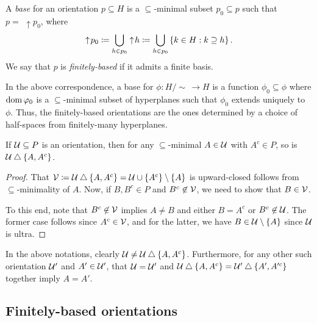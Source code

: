 \documentclass{amsart}
\begin{document}
    \begin{definition}
        A \textit{base} for an orientation $p\subseteq H$ is a $\subseteq$-minimal subset $p_0\subseteq p$ such that $p=\,\,\uparrow\! p_0$, where
        \begin{equation*}
            \uparrow\! p_0\coloneqq\bigcup_{h\in p_0}\uparrow\! h\coloneqq\bigcup_{h\in p_0}\left\{k\in H: k\supseteq h\right\}.
        \end{equation*}
        We say that $p$ is \textit{finitely-based} if it admits a finite basis.
    \end{definition}

    In the above correspondence, a base for $\phi:H/\!\sim\,\to H$ is a function $\phi_0\subseteq\phi$ where $\operatorname{dom}\varphi_0$ is a $\subseteq$-minimal subset of hyperplanes such that $\phi_0$ extends uniquely to $\phi$. Thus, the finitely-based orientations are the ones determined by a choice of half-spaces from finitely-many hyperplanes.

    \begin{lemma}\label{tree-well-defined}
        If $\mathcal{U}\subseteq P$ is an orientation, then for any $\subseteq$-minimal $A\in\mathcal{U}$ with $A^c\in P$, so is $\mathcal{U}\bigtriangleup\left\{A,A^c\right\}$.
    \end{lemma}
    \begin{proof}
        That $\mathcal{V}\coloneqq\mathcal{U}\bigtriangleup\left\{A,A^c\right\}=\mathcal{U}\cup\left\{A^c\right\}\setminus\left\{A\right\}$ is upward-closed follows from $\subseteq$-minimality of $A$. Now, if $B,B^c\in P$ and $B^c\not\in\mathcal{V}$, we need to show that $B\in\mathcal{V}$.

        To this end, note that $B^c\not\in\mathcal{V}$ implies $A\neq B$ and either $B=A^c$ or $B^c\not\in\mathcal{U}$. The former case follows since $A^c\in\mathcal{V}$, and for the latter, we have $B\in\mathcal{U}\setminus\left\{A\right\}$ since $\mathcal{U}$ is ultra.
    \end{proof}

    \begin{remark}\label{tree-no-loops}
        In the above notations, clearly $\mathcal{U}\neq\mathcal{U}\bigtriangleup\left\{A,A^c\right\}$. Furthermore, for any other such orientation $\mathcal{U}'$ and $A'\in\mathcal{U}'$, that $\mathcal{U}=\mathcal{U}'$ and $\mathcal{U}\bigtriangleup\left\{A,A^c\right\}=\mathcal{U}'\bigtriangleup\left\{A',A'^c\right\}$ together imply $A=A'$.
    \end{remark}

    \subsection{Finitely-based orientations}
\end{document}
